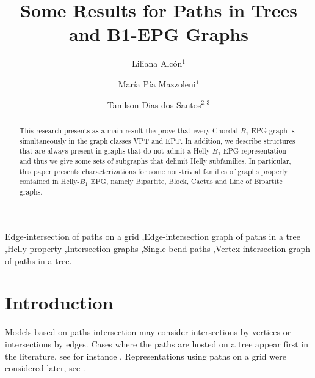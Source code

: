 \documentclass[9pt]{entcs}
\begin{document}
\begin{frontmatter}
  \title{Some Results for Paths in Trees and B1-EPG Graphs}
  
 	\author{Liliana Alc\'{o}n$^{1}$}
 	\author{Mar\'{i}a P\'{i}a Mazzoleni$^{1}$}
 	\author{Tanilson Dias dos Santos$^{2,3}$}
	
 	\address{$^{1}$ Nacional University of La Plata, La Plata, Argentina.\\$^{2}$ Federal University of Rio de Janeiro - UFRJ, Brazil. \\$^{3}$ Federal University of Tocantins - UFT, Brazil.}
	

\begin{abstract}
This research presents as a main result the prove that every Chordal $B_1$-EPG graph is simultaneously in the graph classes VPT and EPT. In addition, we  describe structures that are always present in graphs that do not admit a Helly-$B_1$-EPG representation and thus we give some sets of subgraphs that delimit Helly subfamilies.   
In particular, this paper presents characterizations for some non-trivial families of graphs properly contained in Helly-$B_1$ EPG, namely Bipartite, Block, Cactus and Line of Bipartite  graphs. 
\end{abstract}
 
\begin{keyword}
Edge-intersection of paths on a grid \sep Edge-intersection graph of paths in a tree  \sep Helly property \sep Intersection graphs \sep Single bend paths \sep Vertex-intersection graph of paths in a tree.
\end{keyword} 



\end{frontmatter}


\section{Introduction}

Models based on paths intersection  may consider  intersections by vertices or   intersections by edges.  Cases where the paths are hosted on a tree  appear first in the literature, see for instance \cite{gavril1978recognition, golumbic1985edge, golumbic1985}.  Representations using paths on a grid were considered later, see  \cite{golumbic2009,golumbic2013, golumbic2013intersection}. %
\end{document}
